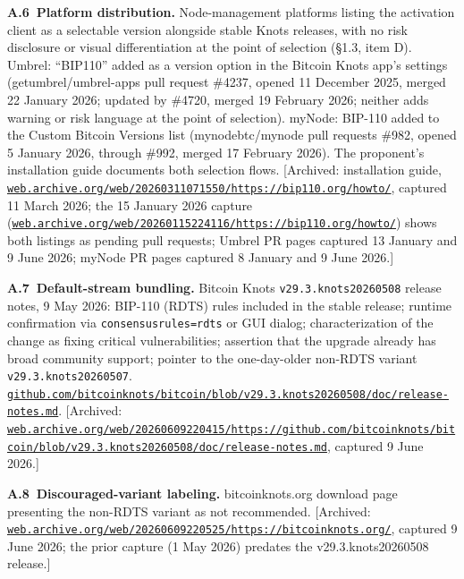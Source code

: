 \documentclass[11pt, twoside, openright]{book}
\newcommand{\reqitem}[2]{\medskip\noindent\textbf{#1\ #2}\quad\ignorespaces}
\newcommand{\sect}[1]{\S#1}
\begin{document}
\reqitem{A.6}{Platform distribution.} Node-management platforms listing the activation client as a selectable version alongside stable Knots releases, with no risk disclosure or visual differentiation at the point of selection (\sect{1.3}, item D). Umbrel: ``BIP110'' added as a version option in the Bitcoin Knots app's settings (getumbrel/umbrel-apps pull request \#4237, opened 11 December 2025, merged 22 January 2026; updated by \#4720, merged 19 February 2026; neither adds warning or risk language at the point of selection). myNode: BIP-110 added to the Custom Bitcoin Versions list (mynodebtc/mynode pull requests \#982, opened 5 January 2026, through \#992, merged 17 February 2026). The proponent's installation guide documents both selection flows. [Archived: installation guide, \href{https://web.archive.org/web/20260311071550/https://bip110.org/howto/}{\nolinkurl{web.archive.org/web/20260311071550/https://bip110.org/howto/}}, captured 11 March 2026; the 15 January 2026 capture (\href{https://web.archive.org/web/20260115224116/https://bip110.org/howto/}{\nolinkurl{web.archive.org/web/20260115224116/https://bip110.org/howto/}}) shows both listings as pending pull requests; Umbrel PR pages captured 13 January and 9 June 2026; myNode PR pages captured 8 January and 9 June 2026.]

\reqitem{A.7}{Default-stream bundling.} Bitcoin Knots \texttt{v29.3.knots20260508} release notes, 9 May 2026: BIP-110 (RDTS) rules included in the stable release; runtime confirmation via \texttt{consensusrules=rdts} or GUI dialog; characterization of the change as fixing critical vulnerabilities; assertion that the upgrade already has broad community support; pointer to the one-day-older non-RDTS variant \texttt{v29.3.knots20260507}. \href{https://github.com/bitcoinknots/bitcoin/blob/v29.3.knots20260508/doc/release-notes.md}{\nolinkurl{github.com/bitcoinknots/bitcoin/blob/v29.3.knots20260508/doc/release-notes.md}}. [Archived: \href{https://web.archive.org/web/20260609220415/https://github.com/bitcoinknots/bitcoin/blob/v29.3.knots20260508/doc/release-notes.md}{\nolinkurl{web.archive.org/web/20260609220415/https://github.com/bitcoinknots/bitcoin/blob/v29.3.knots20260508/doc/release-notes.md}}, captured 9 June 2026.]

\reqitem{A.8}{Discouraged-variant labeling.} bitcoinknots.org download page presenting the non-RDTS variant as not recommended. [Archived: \href{https://web.archive.org/web/20260609220525/https://bitcoinknots.org/}{\nolinkurl{web.archive.org/web/20260609220525/https://bitcoinknots.org/}}, captured 9 June 2026; the prior capture (1 May 2026) predates the v29.3.knots20260508 release.]
\end{document}
